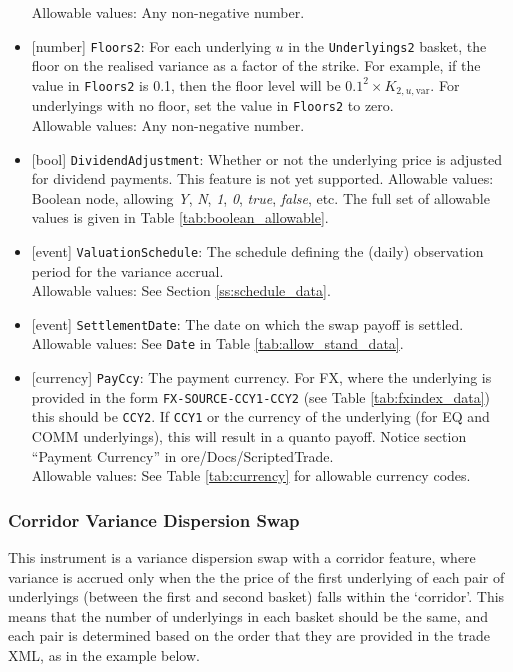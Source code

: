 \begin{itemize}
  Allowable values: Any non-negative number.
  \item{}[number] \lstinline!Floors2!: For each underlying $u$ in the \lstinline!Underlyings2! basket, the floor on the realised
  variance as a factor of the strike. For example, if the value in \lstinline!Floors2! is 0.1, then the floor level will
  be $0.1^2 \times K_{2,u,\text{var}}$. For underlyings with no floor, set the value in \lstinline!Floors2! to zero. \\
  Allowable values: Any non-negative number.
  \item{}[bool] \lstinline!DividendAdjustment!: Whether or not the underlying price is adjusted for dividend payments. This feature is
  not yet supported.
  Allowable values: Boolean node, allowing \emph{Y}, \emph{N}, \emph{1}, \emph{0}, \emph{true}, \emph{false}, etc.
  The full set of allowable values is given in Table \ref{tab:boolean_allowable}.
  \item{}[event] \lstinline!ValuationSchedule!: The schedule defining the (daily) observation period for the variance accrual. \\
  Allowable values: See Section \ref{ss:schedule_data}.
  \item{}[event] \lstinline!SettlementDate!: The date on which the swap payoff is settled. \\
  Allowable values: See \lstinline!Date! in Table \ref{tab:allow_stand_data}.
  \item{}[currency] \lstinline!PayCcy!: The payment currency. For FX, where the underlying is provided
      in the form \lstinline!FX-SOURCE-CCY1-CCY2! (see Table \ref{tab:fxindex_data}) this should
      be \lstinline!CCY2!. If \lstinline!CCY1! or the currency of the underlying (for EQ and
      COMM underlyings), this will result in a quanto payoff. Notice section ``Payment Currency'' in ore/Docs/ScriptedTrade. \\
        Allowable values: See Table \ref{tab:currency} for allowable currency codes.
\end{itemize}

\subsubsection*{Corridor Variance Dispersion Swap}

This instrument is a variance dispersion swap with a corridor feature, where variance is accrued only when the
the price of the first underlying of each pair of underlyings (between the first and second basket) falls within
the `corridor'. This means that the number of underlyings in each basket should be the same, and each pair is
determined based on the order that they are provided in the trade XML, as in the example below.

